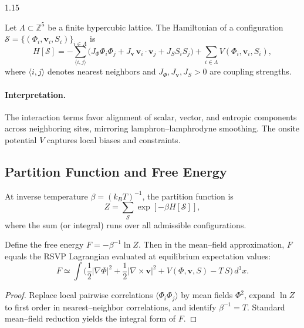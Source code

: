 \documentclass[12pt,a4paper]{article}
\begin{document}
\begin{spacing}{1.15}
\begin{definition}
\label{def:hamiltonian}
Let $\Lambda\subset\mathbb{Z}^5$ be a finite hypercubic lattice.
The Hamiltonian of a configuration
$\mathcal{S}=\{(\Phi_i,\mathbf{v}_i,S_i)\}_{i\in\Lambda}$
is
\[
H[\mathcal{S}]
 = -\!\!\sum_{\langle i,j\rangle}\!
   \Big(
     J_\Phi \Phi_i\Phi_j
     + J_{\mathbf{v}}\,\mathbf{v}_i\!\cdot\!\mathbf{v}_j
     + J_S S_i S_j
   \Big)
   + \sum_{i\in\Lambda}V(\Phi_i,\mathbf{v}_i,S_i),
\]
where $\langle i,j\rangle$ denotes nearest neighbors and
$J_\Phi,J_{\mathbf{v}},J_S>0$ are coupling strengths.
\end{definition}

\paragraph{Interpretation.}
The interaction terms favor alignment of scalar, vector, and entropic
components across neighboring sites, mirroring lamphron–lamphrodyne
smoothing.
The onsite potential $V$ captures local biases and constraints.

\subsection{Partition Function and Free Energy}

\begin{definition}
\label{def:partition}
At inverse temperature $\beta=(k_B T)^{-1}$,
the partition function is
\[
Z = \sum_{\mathcal{S}}
   \exp[-\beta H[\mathcal{S}]],
\]
where the sum (or integral) runs over all admissible configurations.
\]
\end{definition}

\begin{proposition}
\label{prop:free}
Define the free energy
$F = -\beta^{-1}\ln Z$.
Then in the mean–field approximation,
$F$ equals the RSVP Lagrangian evaluated at equilibrium expectation
values:
\[
F \simeq \int\!\Big(
  \frac{1}{2}|\nabla\Phi|^2
 +\frac{1}{2}|\nabla\times\mathbf{v}|^2
 +V(\Phi,\mathbf{v},S)
 -T\,S
\Big)\,d^3x.
\]
\end{proposition}

\begin{proof}
Replace local pairwise correlations
$\langle\Phi_i\Phi_j\rangle$
by mean fields $\Phi^2$, expand $\ln Z$ to first order in
nearest–neighbor correlations, and identify $\beta^{-1}=T$.
Standard mean–field reduction yields the integral form of $F$.
\end{proof}


\end{spacing}
\end{document}
